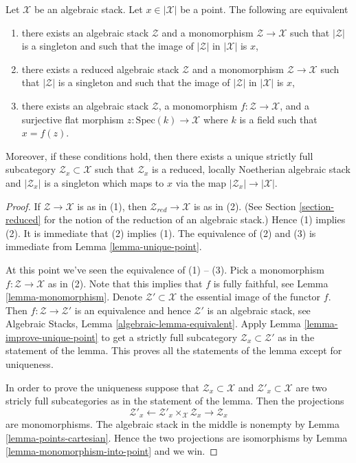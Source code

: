\begin{lemma}
\label{lemma-residual-gerbe}
Let $\mathcal{X}$ be an algebraic stack. Let $x \in |\mathcal{X}|$ be a point.
The following are equivalent
\begin{enumerate}
\item there exists an algebraic stack $\mathcal{Z}$ and a monomorphism
$\mathcal{Z} \to \mathcal{X}$ such that $|\mathcal{Z}|$ is a singleton
and such that the image of $|\mathcal{Z}|$ in $|\mathcal{X}|$ is $x$,
\item there exists a reduced algebraic stack $\mathcal{Z}$ and a monomorphism
$\mathcal{Z} \to \mathcal{X}$ such that $|\mathcal{Z}|$ is a singleton
and such that the image of $|\mathcal{Z}|$ in $|\mathcal{X}|$ is $x$,
\item there exists an algebraic stack $\mathcal{Z}$, a monomorphism
$f : \mathcal{Z} \to \mathcal{X}$, and a surjective flat morphism
$z : \text{Spec}(k) \to \mathcal{X}$ where $k$ is a field such that
$x = f(z)$.
\end{enumerate}
Moreover, if these conditions hold, then there exists a unique
strictly full subcategory $\mathcal{Z}_x \subset \mathcal{X}$
such that $\mathcal{Z}_x$ is a reduced, locally Noetherian algebraic
stack and $|\mathcal{Z}_x|$ is a singleton which maps to $x$
via the map $|\mathcal{Z}_x| \to |\mathcal{X}|$.
\end{lemma}

\begin{proof}
If $\mathcal{Z} \to \mathcal{X}$ is as in (1), then
$\mathcal{Z}_{red} \to \mathcal{X}$ is as in (2). (See
Section \ref{section-reduced}
for the notion of the reduction of an algebraic stack.)
Hence (1) implies (2).
It is immediate that (2) implies (1).
The equivalence of (2) and (3) is immediate from
Lemma \ref{lemma-unique-point}.

\medskip\noindent
At this point we've seen the equivalence of (1) -- (3).
Pick a monomorphism $f : \mathcal{Z} \to \mathcal{X}$ as in (2).
Note that this implies that $f$ is fully faithful, see
Lemma \ref{lemma-monomorphism}.
Denote $\mathcal{Z}' \subset \mathcal{X}$ the essential image of the functor
$f$. Then $f : \mathcal{Z} \to \mathcal{Z}'$ is an equivalence and hence
$\mathcal{Z}'$ is an algebraic stack, see
Algebraic Stacks, Lemma \ref{algebraic-lemma-equivalent}.
Apply
Lemma \ref{lemma-improve-unique-point}
to get a strictly full subcategory $\mathcal{Z}_x \subset \mathcal{Z}'$
as in the statement of the lemma.
This proves all the statements of the lemma except for uniqueness.

\medskip\noindent
In order to prove the uniqueness suppose that
$\mathcal{Z}_x \subset \mathcal{X}$
and
$\mathcal{Z}'_x \subset \mathcal{X}$
are two stricly full subcategories as in the statement of the lemma.
Then the projections
$$
\mathcal{Z}'_x
\longleftarrow
\mathcal{Z}'_x \times_\mathcal{X} \mathcal{Z}_x
\longrightarrow
\mathcal{Z}_x
$$
are monomorphisms. The algebraic stack in the middle is nonempty by
Lemma \ref{lemma-points-cartesian}.
Hence the two projections are isomorphisms by
Lemma \ref{lemma-monomorphism-into-point}
and we win.
\end{proof}

